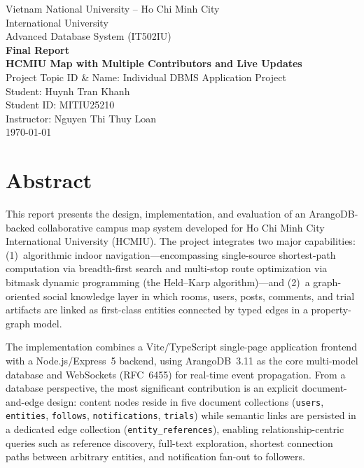 \documentclass[13pt,a4paper]{report}
\begin{document}
\thispagestyle{empty}
\begin{center}
{\large Vietnam National University -- Ho Chi Minh City \\ International University}\\[1.0cm]
{\large Advanced Database System (IT502IU)}\\[1.4cm]
{\LARGE \textbf{Final Report}}\\[0.4cm]
{\Large \textbf{HCMIU Map with Multiple Contributors and Live Updates}}\\[0.8cm]
Project Topic ID \& Name: Individual DBMS Application Project\\[1.2cm]
Student: Huynh Tran Khanh\\
Student ID: MITIU25210\\[0.6cm]
Instructor: Nguyen Thi Thuy Loan\\[2.0cm]
\vfill
\today
\end{center}
\clearpage

\setcounter{page}{2}
\tableofcontents
\clearpage

\chapter*{Abstract}
This report presents the design, implementation, and evaluation of an ArangoDB-backed collaborative campus map system developed for Ho Chi Minh City International University (HCMIU). The project integrates two major capabilities: (1)~algorithmic indoor navigation---encompassing single-source shortest-path computation via breadth-first search and multi-stop route optimization via bitmask dynamic programming (the Held--Karp algorithm)---and (2)~a graph-oriented social knowledge layer in which rooms, users, posts, comments, and trial artifacts are linked as first-class entities connected by typed edges in a property-graph model.

The implementation combines a Vite/TypeScript single-page application frontend with a Node.js/Express~5 backend, using ArangoDB~3.11 as the core multi-model database and WebSockets (RFC~6455) for real-time event propagation. From a database perspective, the most significant contribution is an explicit document-and-edge design: content nodes reside in five document collections (\texttt{users}, \texttt{entities}, \texttt{follows}, \texttt{notifications}, \texttt{trials}) while semantic links are persisted in a dedicated edge collection (\texttt{entity\_references}), enabling relationship-centric queries such as reference discovery, full-text exploration, shortest connection paths between arbitrary entities, and notification fan-out to followers.
\end{document}
